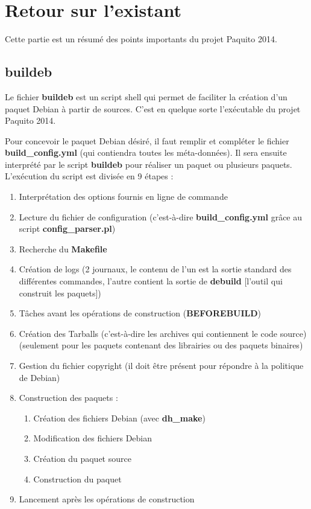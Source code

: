 \documentclass[12pt,a4paper]{article}
\begin{document}
\section{Retour sur l'existant}
Cette partie est un résumé des points importants du projet Paquito 2014.
\subsection{buildeb}
Le fichier \textbf{buildeb} est un script shell qui permet de faciliter la création d'un paquet Debian à partir de sources. C'est en quelque sorte l'exécutable du projet Paquito 2014.

Pour concevoir le paquet Debian désiré, il faut remplir et compléter le fichier \textbf{build\_config.yml} (qui contiendra toutes les méta-données). Il sera ensuite interprété par le script \textbf{buildeb} pour réaliser un paquet ou plusieurs paquets. L'exécution du script est divisée en 9 étapes :
\begin{enumerate}
	\item Interprétation des options fournis en ligne de commande
	\item Lecture du fichier de configuration (c'est-à-dire \textbf{build\_config.yml} grâce au script \textbf{config\_parser.pl})
	\item Recherche du \textbf{Makefile}
	\item Création de logs (2 journaux, le contenu de l'un est la sortie standard des différentes commandes, l'autre contient la sortie de \textbf{debuild} [l'outil qui construit les paquets]) 
	\item Tâches avant les opérations de construction (\textbf{BEFOREBUILD})
	\item Création des Tarballs (c'est-à-dire les archives qui contiennent le code source) (seulement pour les paquets contenant des librairies ou des paquets binaires)
	\item Gestion du fichier copyright (il doit être présent pour répondre à la politique de Debian)
	\item Construction des paquets :
	\begin{enumerate}
		\item Création des fichiers Debian (avec \textbf{dh\_make}) 
		\item Modification des fichiers Debian 
		\item Création du paquet source 
		\item Construction du paquet 
	\end{enumerate}
	\item Lancement après les opérations de construction
\end{enumerate}
\end{document}
